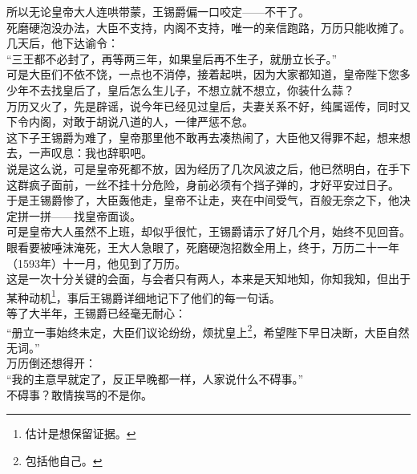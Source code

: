 \begin{multicols}{\theparacolNo}
所以无论皇帝大人连哄带蒙，王锡爵偏一口咬定——不干了。\\

死磨硬泡没办法，大臣不支持，内阁不支持，唯一的亲信跑路，万历只能收摊了。\\

几天后，他下达谕令：\\

“三王都不必封了，再等两三年，如果皇后再不生子，就册立长子。”\\

可是大臣们不依不饶，一点也不消停，接着起哄，因为大家都知道，皇帝陛下您多少年不去找皇后了，皇后怎么生儿子，不想立就不想立，你装什么蒜？\\

万历又火了，先是辟谣，说今年已经见过皇后，夫妻关系不好，纯属谣传，同时又下令内阁，对敢于胡说八道的人，一律严惩不怠。\\

这下子王锡爵为难了，皇帝那里他不敢再去凑热闹了，大臣他又得罪不起，想来想去，一声叹息：我也辞职吧。\\

说是这么说，可是皇帝死都不放，因为经历了几次风波之后，他已然明白，在手下这群疯子面前，一丝不挂十分危险，身前必须有个挡子弹的，才好平安过日子。\\

于是王锡爵惨了，大臣轰他走，皇帝不让走，夹在中间受气，百般无奈之下，他决定拼一拼——找皇帝面谈。\\

可是皇帝大人虽然不上班，却似乎很忙，王锡爵请示了好几个月，始终不见回音。眼看要被唾沫淹死，王大人急眼了，死磨硬泡招数全用上，终于，万历二十一年（1593年）十一月，他见到了万历。\\

这是一次十分关键的会面，与会者只有两人，本来是天知地知，你知我知，但出于某种动机\footnote{估计是想保留证据。}，事后王锡爵详细地记下了他们的每一句话。\\

等了大半年，王锡爵已经毫无耐心：\\

“册立一事始终未定，大臣们议论纷纷，烦扰皇上\footnote{包括他自己。}，希望陛下早日决断，大臣自然无词。”\\

万历倒还想得开：\\

“我的主意早就定了，反正早晚都一样，人家说什么不碍事。”\\

不碍事？敢情挨骂的不是你。\\


\end{multicols}
